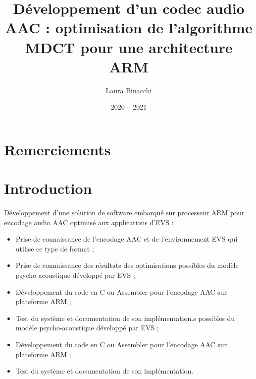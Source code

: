 \documentclass{article}
\title{Développement d'un codec audio AAC : optimisation de l'algorithme MDCT pour une architecture ARM}
\date{2020 -- 2021}
\author{Laura Binacchi}
\begin{document}
    
    \newpage
    \tableofcontents
    \newpage
    \listoffigures

    \newpage
    \section*{Remerciements}

    \newpage
    \section*{Introduction}


    \paragraph{}
    Développement d'une solution de software embarqué sur processeur ARM pour encodage audio AAC optimisé aux applications d'EVS :
    \begin{itemize}
        \item Prise de connaissance de l'encodage AAC et de l'environnement EVS qui utilise ce type de format ;
        \item Prise de connaissance des résultats des optimisations possibles du modèle psycho-acoustique développé par EVS ;
        \item Développement du code en C ou Assembler pour l'encodage AAC sur plateforme ARM ;
        \item Test du système et documentation de son implémentation.s possibles du modèle psycho-acoustique développé par EVS ;
        \item Développement du code en C ou Assembler pour l'encodage AAC sur plateforme ARM ;
        \item Test du système et documentation de son implémentation.
    \end{itemize}
\end{document}
